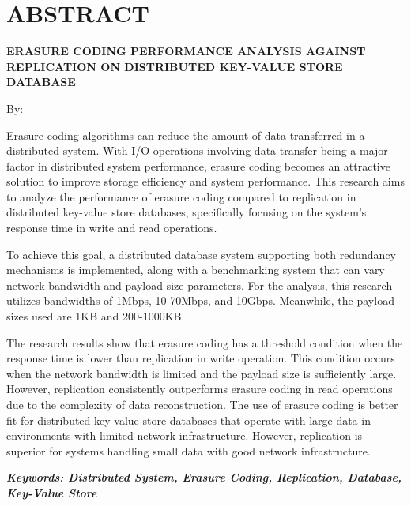 \clearpage
\chapter*{ABSTRACT}

\begin{center}
  \center
  \begin{singlespace}
    \large\bfseries\MakeUppercase{Erasure Coding Performance Analysis Against Replication on Distributed Key-Value Store Database}
    
    \normalfont\normalsize
    By:
    
    \bfseries \theauthor
  \end{singlespace}
\end{center}


\begin{singlespace}
  \small
  Erasure coding algorithms can reduce the amount of data transferred in a distributed system. With I/O operations involving data transfer being a major factor in distributed system performance, erasure coding becomes an attractive solution to improve storage efficiency and system performance. This research aims to analyze the performance of erasure coding compared to replication in distributed key-value store databases, specifically focusing on the system's response time in write and read operations.

  To achieve this goal, a distributed database system supporting both redundancy mechanisms is implemented, along with a benchmarking system that can vary network bandwidth and payload size parameters. For the analysis, this research utilizes bandwidths of 1Mbps, 10-70Mbps, and 10Gbps. Meanwhile, the payload sizes used are 1KB and 200-1000KB.

  The research results show that erasure coding has a threshold condition when the response time is lower than replication in write operation. This condition occurs when the network bandwidth is limited and the payload size is sufficiently large. However, replication consistently outperforms erasure coding in read operations due to the complexity of data reconstruction. The use of erasure coding is better fit for distributed key-value store databases that operate with large data in environments with limited network infrastructure. However, replication is superior for systems handling small data with good network infrastructure.

  \textbf{\textit{Keywords: Distributed System, Erasure Coding, Replication, Database, Key-Value Store }}
\end{singlespace}
\clearpage

\clearpage